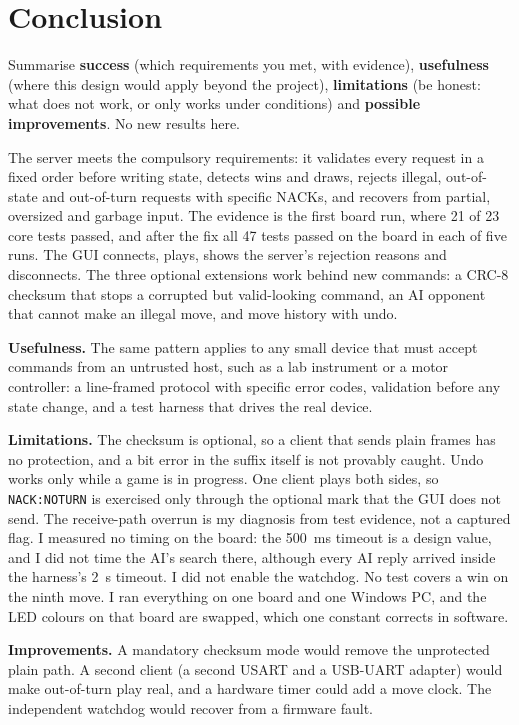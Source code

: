 \section{Conclusion}
\label{sec:conclusion}

\begin{guidance}
Summarise \textbf{success} (which requirements you met, with evidence),
\textbf{usefulness} (where this design would apply beyond the project),
\textbf{limitations} (be honest: what does not work, or only works under
conditions) and \textbf{possible improvements}. No new results here.
\end{guidance}

The server meets the compulsory requirements: it validates every request in a
fixed order before writing state, detects wins and draws, rejects illegal,
out-of-state and out-of-turn requests with specific NACKs, and recovers from
partial, oversized and garbage input. The evidence is the first board run, where
21 of 23 core tests passed, and after the fix all 47 tests passed on the board in each
of five runs. The GUI connects,
plays, shows the server's rejection reasons and disconnects. The three optional
extensions work behind new commands: a CRC-8 checksum that stops a corrupted
but valid-looking command, an AI opponent that cannot make an illegal move, and
move history with undo.

\textbf{Usefulness.} The same pattern applies to any small device that must
accept commands from an untrusted host, such as a lab instrument or a motor
controller: a line-framed protocol with specific error codes, validation before
any state change, and a test harness that drives the real device.

\textbf{Limitations.} The checksum is optional, so a client that sends plain
frames has no protection, and a bit error in the suffix itself is not provably
caught. Undo works only while a game is in progress. One client plays both sides, so
\texttt{NACK:NOTURN} is exercised only through the optional mark that the GUI
does not send. The receive-path overrun is my diagnosis from test evidence, not
a captured flag. I measured no timing on the board: the 500~ms timeout is a
design value, and I did not time the AI's search there, although every AI reply arrived inside
the harness's 2~s timeout. I did not enable the watchdog. No test covers a win on the ninth
move. I ran everything on one board and one Windows PC, and the LED colours on
that board are swapped, which one constant corrects in software.

\textbf{Improvements.} A mandatory checksum mode would remove the unprotected
plain path. A second client (a second USART and a USB-UART adapter) would make
out-of-turn play real, and a hardware timer could add a move clock. The
independent watchdog would recover from a firmware fault.
